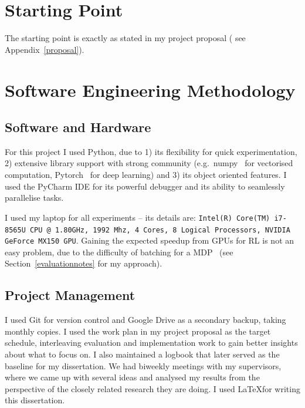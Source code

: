 \section{Starting Point}

The starting point is exactly as stated in my project proposal ( see Appendix~\ref{proposal}). 


\section{Software Engineering Methodology}





\subsection{Software and Hardware}


For this project I used Python, due to 1) its flexibility for quick experimentation, 2) extensive library support with strong community (e.g.\ numpy~\cite{harris2020numpy} for vectorised computation, Pytorch~\cite{paszke2019pytorch} for deep learning) and 3) its object oriented features. I used the PyCharm IDE for its powerful debugger and its ability to seamlessly parallelise tasks.


I used my laptop for all experiments -- its details are: \texttt{Intel(R) Core(TM) i7-8565U CPU @ 1.80GHz, 1992 Mhz, 4 Cores, 8 Logical Processors, NVIDIA GeForce MX150 GPU}. Gaining the expected speedup from GPUs for RL is not an easy problem, due to the difficulty of batching for a MDP~\cite{stooke2018gpudeepRL} (see Section~\ref{evaluationnotes} for my approach).


\subsection{Project Management}

I used Git for version control and Google Drive as a secondary backup, taking monthly copies. I used the work plan in my project proposal as the target schedule, interleaving evaluation and implementation work to gain better insights about what to focus on. I also maintained a logbook that later served as the baseline for my dissertation. We had biweekly meetings with my supervisors, where we came up with several ideas and analysed my results from the perspective of the closely related research they are doing. I used \LaTeX for writing this dissertation.

